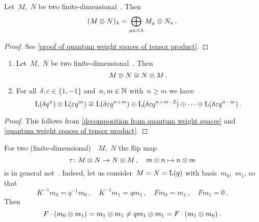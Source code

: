 \documentclass[a4paper, 11pt, oneside]{scrartcl}
\begin{document}
\begin{lemma}
  \label{quantum weight spaces of tensor product}
  Let~$M$,~$N$ be two finite-dimensional~.
  Then
  \[
    (M \otimes N)_\lambda
    =
    \bigoplus_{\mu \kappa = \lambda}
    M_\mu \otimes N_\kappa \,.
  \]
\end{lemma}

\begin{proof}
  See \cref{proof of quantum weight spaces of tensor product}.
\end{proof}

\begin{corollary}
  \leavevmode
  \begin{enumerate}
    \item
      Let~$M$,~$N$ be two finite-dimensional~.
      Then
      \[
        M \otimes N
        \cong
        N \otimes M \,.
      \]
    \item
      For all~$\delta, \varepsilon \in \{1, -1\}$ and~$n, m \in \mathbb{N}$ with~$n \geq m$ we have
      \[
        \operatorname{L}(\delta q^n) \otimes \operatorname{L}(\varepsilon q^m)
        \cong
        \operatorname{L}(\delta \varepsilon q^{n+m})
        \oplus
        \operatorname{L}(\delta \varepsilon q^{n+m-2})
        \oplus
        \dotsb
        \oplus
        \operatorname{L}(\delta \varepsilon q^{n-m}) \,.
      \]
  \end{enumerate}
\end{corollary}

\begin{proof}
  This follows from \cref{decomposition from quantum weight spaces} and \cref{quantum weight spaces of tensor product}.
\end{proof}

\begin{warning}
  For two (finite-dimensional)~~$M$,~$N$ the flip map
  \[
    \tau
    \colon
    M \otimes N
    \to
    N \otimes M \,,
    \quad
    m \otimes n
    \mapsto
    n \otimes m
  \]
  is in general not~.
  Indeed, let us consider~$M = N = \operatorname{L}(q)$ with basis~$m_0$,~$m_1$, so that
  \[
    K^{-1} m_0 = q^{-1} m_0 \,,
    \quad
    K^{-1} m_1 = q m_1 \,,
    \quad
    F m_0 = m_1 \,,
    \quad
    F m_1 = 0 \,.
  \]
  Then
  \[
    F \cdot (m_0 \otimes m_1)
    =
    m_1 \otimes m_1
    \neq
    q m_1 \otimes m_1
    =
    F \cdot (m_1 \otimes m_0) \,.
  \]
\end{warning}
\end{document}
